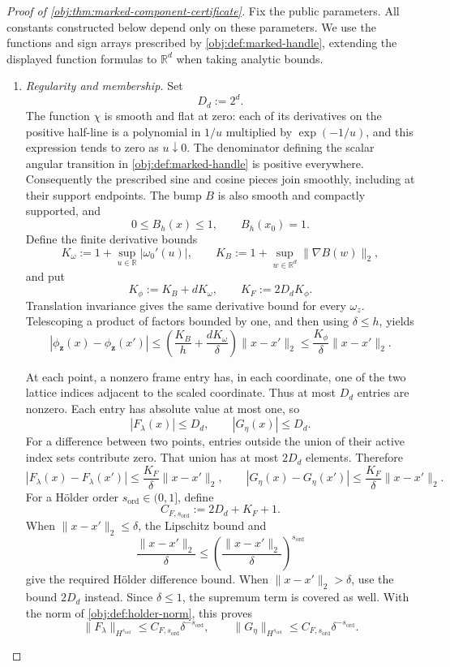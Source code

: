 \begin{proof}[Proof of \cref{obj:thm:marked-component-certificate}]
Fix the public parameters. All constants constructed below depend only on these parameters. We use the functions and sign arrays prescribed by \cref{obj:def:marked-handle}, extending the displayed function formulas to \(\mathbb R^d\) when taking analytic bounds.

\begin{enumerate}
\item \textit{Regularity and membership.}
Set
\[
D_d:=2^d.
\]
The function \(\chi\) is smooth and flat at zero: each of its derivatives on the positive half-line is a polynomial in \(1/u\) multiplied by \(\exp(-1/u)\), and this expression tends to zero as \(u\downarrow0\). The denominator defining the scalar angular transition in \cref{obj:def:marked-handle} is positive everywhere. Consequently the prescribed sine and cosine pieces join smoothly, including at their support endpoints. The bump \(B\) is also smooth and compactly supported, and
\[
0\le B_h(x)\le1,\qquad B_h(x_0)=1.
\]
Define the finite derivative bounds
\[
K_\omega:=1+\sup_{u\in\mathbb R}|\omega_0'(u)|,
\qquad
K_B:=1+\sup_{w\in\mathbb R^d}\|\nabla B(w)\|_2,
\]
and put
\[
K_\phi:=K_B+dK_\omega,
\qquad
K_F:=2D_dK_\phi.
\]
Translation invariance gives the same derivative bound for every \(\omega_z\). Telescoping a product of factors bounded by one, and then using \(\delta\le h\), yields
\[
|\phi_{\mathbf z}(x)-\phi_{\mathbf z}(x')|
\le
\left(\frac{K_B}{h}+\frac{dK_\omega}{\delta}\right)
\|x-x'\|_2
\le
\frac{K_\phi}{\delta}\|x-x'\|_2.
\]

At each point, a nonzero frame entry has, in each coordinate, one of the two lattice indices adjacent to the scaled coordinate. Thus at most \(D_d\) entries are nonzero. Each entry has absolute value at most one, so
\[
|F_\lambda(x)|\le D_d,
\qquad
|G_\eta(x)|\le D_d.
\]
For a difference between two points, entries outside the union of their active index sets contribute zero. That union has at most \(2D_d\) elements. Therefore
\[
|F_\lambda(x)-F_\lambda(x')|
\le \frac{K_F}{\delta}\|x-x'\|_2,
\qquad
|G_\eta(x)-G_\eta(x')|
\le \frac{K_F}{\delta}\|x-x'\|_2.
\]
For a Hölder order \(s_{\mathrm{ord}}\in(0,1]\), define
\[
C_{F,s_{\mathrm{ord}}}:=2D_d+K_F+1.
\]
When \(\|x-x'\|_2\le\delta\), the Lipschitz bound and
\[
\frac{\|x-x'\|_2}{\delta}
\le
\left(\frac{\|x-x'\|_2}{\delta}\right)^{s_{\mathrm{ord}}}
\]
give the required Hölder difference bound. When \(\|x-x'\|_2>\delta\), use the bound \(2D_d\) instead. Since \(\delta\le1\), the supremum term is covered as well. With the norm of \cref{obj:def:holder-norm}, this proves
\[
\|F_\lambda\|_{H^{s_{\mathrm{ord}}}}
\le C_{F,s_{\mathrm{ord}}}\delta^{-s_{\mathrm{ord}}},
\qquad
\|G_\eta\|_{H^{s_{\mathrm{ord}}}}
\le C_{F,s_{\mathrm{ord}}}\delta^{-s_{\mathrm{ord}}}.
\]


\end{enumerate}
\end{proof}
